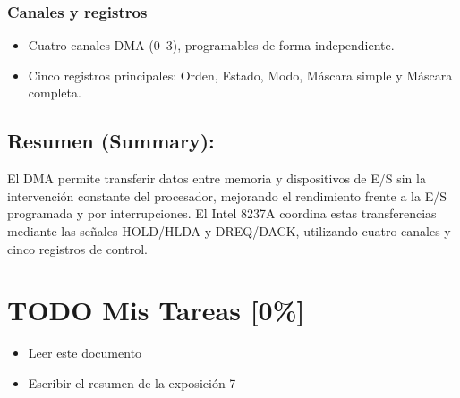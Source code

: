 \documentclass{article}
\begin{document}
\subsubsection{Canales y registros}
\label{sec:org1a60309}
\begin{itemize}
\item Cuatro canales DMA (0–3), programables de forma independiente.
\item Cinco registros principales: Orden, Estado, Modo, Máscara simple y Máscara completa.
\end{itemize}

\subsection{Resumen (Summary):}
\label{sec:org5cf09d4}
El DMA permite transferir datos entre memoria y dispositivos de E/S sin la intervención constante del procesador,
mejorando el rendimiento frente a la E/S programada y por
interrupciones. El Intel 8237A coordina estas transferencias mediante
las señales HOLD/HLDA y DREQ/DACK, utilizando cuatro canales y cinco
registros de control.

\section{{\bfseries\sffamily TODO} Mis Tareas [0\%]}
\label{sec:org2d53f48}
\begin{itemize}
\item[{$\square$}] Leer este documento
\item[{$\square$}] Escribir el resumen de la exposición 7
\end{itemize}
\end{document}
